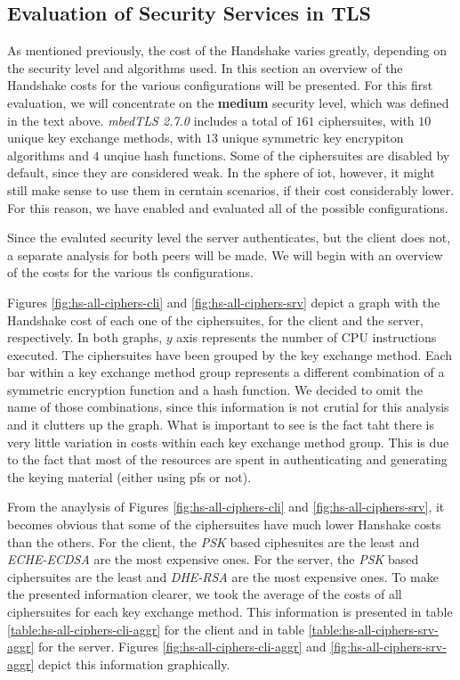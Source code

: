 \documentclass{llncs}
\begin{document}
\subsection{Evaluation of Security Services in TLS}

As mentioned previously, the cost of the Handshake varies greatly, depending on the security level and algorithms used.
In this section an overview of the Handshake costs for the various configurations will be presented. For this
first evaluation, we will concentrate on the \textbf{medium} security level, which was defined in the text above.
\textit{mbedTLS 2.7.0} includes a total of $161$ ciphersuites, with $10$ unique key exchange methods, with $13$ unique
symmetric key encrypiton algorithms and $4$ unqiue hash functions. Some of the ciphersuites are disabled by default,
since they are considered weak. In the sphere of \gls{iot}, however, it might still make sense to use them in cerntain
scenarios, if their cost considerably lower. For this reason, we have enabled and evaluated all of the possible configurations.

Since the evaluted security level the server authenticates, but the client does not,
a separate analysis for both peers will be made. We will begin with an overview of the costs for the various \gls{tls}
configurations.

Figures \ref{fig:hs-all-ciphers-cli} and \ref{fig:hs-all-ciphers-srv} depict a graph with the Handshake cost of each one 
of the ciphersuites, for the client and the server, respectively. In both graphs, $y$ axis represents the number of 
CPU instructions executed. The ciphersuites have been grouped by the key exchange method. Each bar within a key 
exchange method group represents a different combination of a symmetric encryption function and a hash function. 
We decided to omit the name of those combinations, since this information is not crutial for this analysis and it 
clutters up the graph. What is important to see is the fact taht there is very little  variation in costs within 
each key exchange method group. This is due to the fact that most of the resources are spent in authenticating and 
generating the keying material (either using \gls{pfs} or not).

From the anaylysis of Figures \ref{fig:hs-all-ciphers-cli} and \ref{fig:hs-all-ciphers-srv}, it becomes obvious 
that some of the ciphersuites have  much lower Hanshake costs than the others. For the client, the \textit{PSK} based 
ciphesuites are the least and \textit{ECHE-ECDSA} are the most expensive ones. For the server, the \textit{PSK} based
ciphersuites are the least and \textit{DHE-RSA} are the most expensive ones. To make the presented information clearer, 
we took the average of the costs of all ciphersuites for each key exchange method. This information is presented in
table \ref{table:hs-all-ciphers-cli-aggr} for the client and in table \ref{table:hs-all-ciphers-srv-aggr} for the server.
Figures \ref{fig:hs-all-ciphers-cli-aggr} and \ref{fig:hs-all-ciphers-srv-aggr} depict this information graphically.
 
\end{document}
